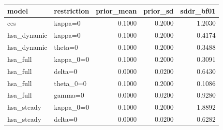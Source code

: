 \begin{tabular}{llrrr}
\toprule
model & restriction & prior\_mean & prior\_sd & sddr\_bf01 \\
\midrule
ces & kappa=0 & 0.1000 & 0.2000 & 1.2030 \\
hsa\_dynamic & kappa=0 & 0.1000 & 0.2000 & 0.4174 \\
hsa\_dynamic & theta=0 & 0.1000 & 0.2000 & 0.3488 \\
hsa\_full & kappa\_0=0 & 0.1000 & 0.2000 & 0.3091 \\
hsa\_full & delta=0 & 0.0000 & 0.0200 & 0.6430 \\
hsa\_full & theta\_0=0 & 0.1000 & 0.2000 & 0.1086 \\
hsa\_full & gamma=0 & 0.0000 & 0.0200 & 0.9280 \\
hsa\_steady & kappa\_0=0 & 0.1000 & 0.2000 & 1.8892 \\
hsa\_steady & delta=0 & 0.0000 & 0.0200 & 0.6282 \\
\bottomrule
\end{tabular}
